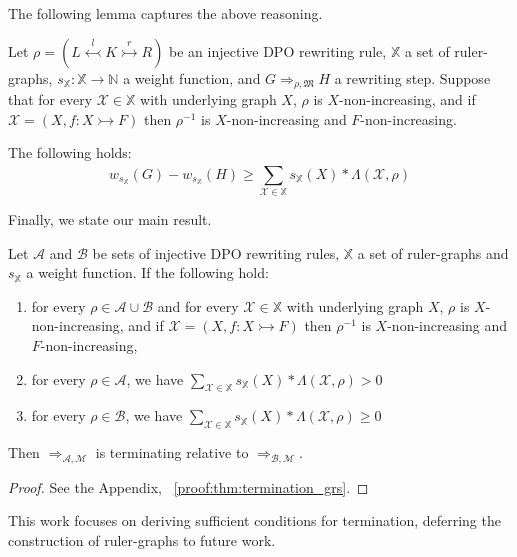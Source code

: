 The following lemma captures the above reasoning.
\begin{lemma}
    \label{lem:w_g_geq_w_h_leq}
    Let $\rho = (L \overset{l}{\leftarrowtail} K \overset{r}{\rightarrowtail} R)$ be an injective DPO rewriting rule,
    \( \mathbb{X} \) a set of ruler-graphs,
    \( s_{\mathbb{X}} \colon \mathbb{X} \to \mathbb{N} \) a weight function,
    and \( G \Rightarrow_{\rho,\mathfrak{M}} H \) a rewriting step. 
    Suppose that for every \( \mathcal{X} \in \mathbb{X} \) with underlying graph $X$, 
    $\rho$ is $X$-non-increasing, and if $\mathcal{X}= (X,f:X \rightarrowtail F)$ then $\rho^{-1}$ is $X$-non-increasing and $F$-non-increasing.
     
    The following holds:
     $$
        w_{s_\mathbb{X}}(G) - w_{s_\mathbb{X}}(H) 
        \geq 
        \sum_{\mathcal{X} \in \mathbb{X}}^{}s_\mathbb{X}(X) * \Lambda(\mathcal{X},\rho)
    $$
\end{lemma}
Finally, we state our main result.
\begin{theorem}[Termination] 
    \label{thm:termination_grs} 
    Let \(\mathcal{A}\) and \(\mathcal{B}\) be sets of injective DPO rewriting rules, $\mathbb{X}$ a set of ruler-graphs and $s_\mathbb{X}$ a weight function. If the following hold:
    \begin{enumerate}
        \item  for every $\rho \in \mathcal{A} \cup \mathcal{B}$ and for every \( \mathcal{X} \in \mathbb{X} \) with underlying graph $X$, 
        $\rho$ is $X$-non-increasing, and if $\mathcal{X}= (X,f:X \rightarrowtail F)$ then $\rho^{-1}$ is $X$-non-increasing and $F$-non-increasing,
        \item for every \(\rho \in \mathcal{A}\), we have
        $ \sum_{\mathcal{X} \in \mathbb{X}}^{}s_\mathbb{X}(X) * 
            \Lambda(\mathcal{X},\rho) > 0 $
        \item for every \(\rho \in \mathcal{B}\), we have   
        $ 
            \sum_{\mathcal{X} \in \mathbb{X}}^{}s_\mathbb{X}(X) * \Lambda(\mathcal{X},\rho) \geq 0 
        $
    \end{enumerate}
    Then \(\Rightarrow_{\mathcal{A},\mathcal{M}}\) is terminating relative to \(\Rightarrow_{\mathcal{B},\mathcal{M}}\).
\end{theorem}
\begin{proof}
    See the Appendix, \textsection~\ref{proof:thm:termination_grs}.
\end{proof}
\begin{remark}
    This work focuses on deriving sufficient conditions for termination, deferring the construction of ruler-graphs to future work.
\end{remark} 